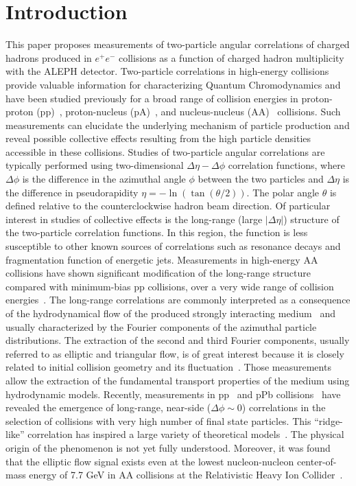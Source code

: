 \documentclass[aps,prl,twocolumn,showpacs,superscriptaddress,groupedaddress]{revtex4}  %
\begin{document}
\section{\label{sec:introduction}Introduction}
This paper proposes measurements of two-particle angular correlations of charged hadrons produced in $e^+e^-$ collisions as a function of charged hadron multiplicity with the ALEPH detector. Two-particle correlations in high-energy collisions provide valuable information for characterizing Quantum Chromodynamics and have been studied previously for a broad range of collision energies in proton-proton (pp)~\cite{Khachatryan:2010gv}, proton-nucleus (pA)~\cite{CMS:2012qk,Abelev:2012ola,Aad:2012gla}, and nucleus-nucleus (AA)~\cite{Aamodt:2010pa,Chatrchyan:2012wg} collisions. Such measurements can elucidate the underlying mechanism of particle production and reveal possible collective effects resulting from the high particle densities accessible in these collisions.
Studies of two-particle angular correlations are typically performed using two-dimensional $\Delta\eta-\Delta\phi$ correlation functions, where $\Delta\phi$ is the difference in the azimuthal angle $\phi$ between the two particles and $\Delta\eta$ is the difference in pseudorapidity $\eta = -\ln(\tan(\theta/2))$. The polar angle $\theta$ is defined relative to the counterclockwise hadron beam direction.
Of particular interest in studies of collective effects is the long-range (large $|\Delta\eta|$) structure of the two-particle correlation functions. In this region, the function is less susceptible to other known sources of correlations such as resonance decays and fragmentation function of energetic jets. Measurements in high-energy AA collisions have shown significant modification of the long-range structure compared with minimum-bias pp collisions, over a very wide range of collision energies~\cite{Back:2004je,Arsene:2004fa,Adcox:2004mh,Adams:2005dq}. The long-range correlations are commonly interpreted as a consequence of the hydrodynamical flow of the produced strongly interacting medium~\cite{Ollitrault:1992bk} and usually characterized by the Fourier components of the azimuthal particle distributions. The extraction of the second and third Fourier components, usually referred to as elliptic and triangular flow, is of great interest because it is closely related to initial collision geometry and its fluctuation~\cite{Alver:2010gr}. Those measurements allow the extraction of the fundamental transport properties of the medium using hydrodynamic models.
Recently, measurements in pp~\cite{Khachatryan:2010gv} and pPb collisions~\cite{CMS:2012qk,Abelev:2012ola,Aad:2012gla} have revealed the emergence of long-range, near-side ($\Delta\phi\sim 0$) correlations in the selection of collisions with very high number of final state particles. This ``ridge-like'' correlation has inspired a large variety of theoretical models~\cite{Bzdak:2013zma,Dusling:2015gta}. The physical origin of the phenomenon is not yet fully understood. Moreover, it was found that the elliptic flow signal exists even at the lowest nucleon-nucleon center-of-mass energy of 7.7 GeV in AA collisions at the Relativistic Heavy Ion Collider~\cite{Adamczyk:2012ku}. 
\end{document}
